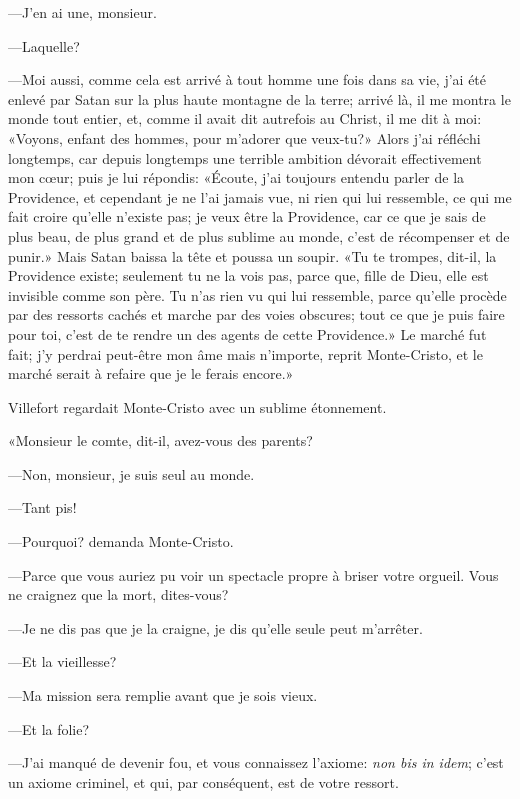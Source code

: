 —J'en ai une, monsieur. 

—Laquelle? 

—Moi aussi, comme cela est arrivé à tout homme une fois dans sa vie, j'ai été enlevé par Satan sur la plus haute montagne de la terre; arrivé là, il me montra le monde tout entier, et, comme il avait dit autrefois au Christ, il me dit à moi: «Voyons, enfant des hommes, pour m'adorer que veux-tu?» Alors j'ai réfléchi longtemps, car depuis longtemps une terrible ambition dévorait effectivement mon cœur; puis je lui répondis: «Écoute, j'ai toujours entendu parler de la Providence, et cependant je ne l'ai jamais vue, ni rien qui lui ressemble, ce qui me fait croire qu'elle n'existe pas; je veux être la Providence, car ce que je sais de plus beau, de plus grand et de plus sublime au monde, c'est de récompenser et de punir.» Mais Satan baissa la tête et poussa un soupir. «Tu te trompes, dit-il, la Providence existe; seulement tu ne la vois pas, parce que, fille de Dieu, elle est invisible comme son père. Tu n'as rien vu qui lui ressemble, parce qu'elle procède par des ressorts cachés et marche par des voies obscures; tout ce que je puis faire pour toi, c'est de te rendre un des agents de cette Providence.» Le marché fut fait; j'y perdrai peut-être mon âme mais n'importe, reprit Monte-Cristo, et le marché serait à refaire que je le ferais encore.» 

Villefort regardait Monte-Cristo avec un sublime étonnement. 

«Monsieur le comte, dit-il, avez-vous des parents? 

—Non, monsieur, je suis seul au monde. 

—Tant pis! 

—Pourquoi? demanda Monte-Cristo. 

—Parce que vous auriez pu voir un spectacle propre à briser votre orgueil. Vous ne craignez que la mort, dites-vous? 

—Je ne dis pas que je la craigne, je dis qu'elle seule peut m'arrêter. 

—Et la vieillesse? 

—Ma mission sera remplie avant que je sois vieux. 

—Et la folie? 

—J'ai manqué de devenir fou, et vous connaissez l'axiome: \textit{non bis in idem}; c'est un axiome criminel, et qui, par conséquent, est de votre ressort. 

